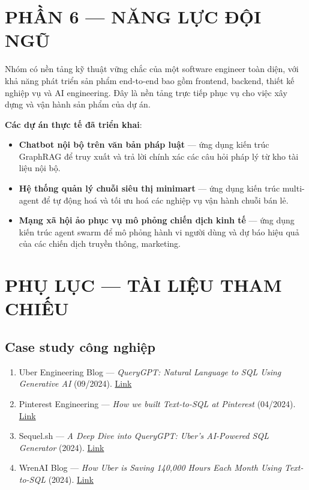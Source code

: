 \documentclass[11pt,a4paper]{article}
\begin{document}
\newpage
\section{PHẦN 6 --- NĂNG LỰC ĐỘI NGŨ}

Nhóm có nền tảng kỹ thuật vững chắc của một software engineer toàn diện, với khả năng phát triển sản phẩm end-to-end bao gồm frontend, backend, thiết kế nghiệp vụ và AI engineering. Đây là nền tảng trực tiếp phục vụ cho việc xây dựng và vận hành sản phẩm của dự án.

\textbf{Các dự án thực tế đã triển khai}:

\begin{itemize}
\item \textbf{Chatbot nội bộ trên văn bản pháp luật} --- ứng dụng kiến trúc GraphRAG để truy xuất và trả lời chính xác các câu hỏi pháp lý từ kho tài liệu nội bộ.
\item \textbf{Hệ thống quản lý chuỗi siêu thị minimart} --- ứng dụng kiến trúc multi-agent để tự động hoá và tối ưu hoá các nghiệp vụ vận hành chuỗi bán lẻ.
\item \textbf{Mạng xã hội ảo phục vụ mô phỏng chiến dịch kinh tế} --- ứng dụng kiến trúc agent swarm để mô phỏng hành vi người dùng và dự báo hiệu quả của các chiến dịch truyền thông, marketing.
\end{itemize}

\newpage
\section*{PHỤ LỤC --- TÀI LIỆU THAM CHIẾU}

\subsection*{Case study công nghiệp}
\begin{enumerate}
\item Uber Engineering Blog --- \textit{QueryGPT: Natural Language to SQL Using Generative AI} (09/2024). \href{https://www.uber.com/us/en/blog/query-gpt/}{Link}
\item Pinterest Engineering --- \textit{How we built Text-to-SQL at Pinterest} (04/2024). \href{https://medium.com/pinterest-engineering/how-we-built-text-to-sql-at-pinterest-30bad30dabff}{Link}
\item Sequel.sh --- \textit{A Deep Dive into QueryGPT: Uber's AI-Powered SQL Generator} (2024). \href{https://sequel.sh/blog/query-gpt-uber}{Link}
\item WrenAI Blog --- \textit{How Uber is Saving 140,000 Hours Each Month Using Text-to-SQL} (2024). \href{https://medium.com/wrenai/how-uber-is-saving-140-000-hours-each-month-using-text-to-sql-and-how-you-can-harness-the-same-fb4818ae4ea3}{Link}
\end{enumerate}
\end{document}
